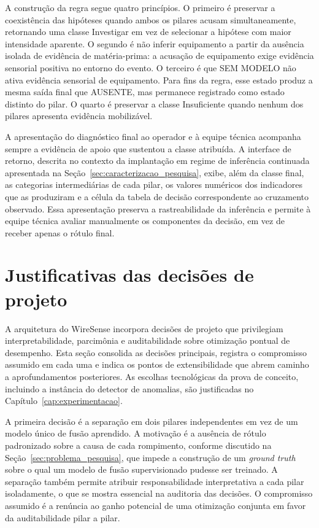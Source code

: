 A construção da regra segue quatro princípios. O primeiro é preservar a coexistência das hipóteses quando ambos os pilares acusam simultaneamente, retornando uma classe Investigar em vez de selecionar a hipótese com maior intensidade aparente. O segundo é não inferir equipamento a partir da ausência isolada de evidência de matéria-prima: a acusação de equipamento exige evidência sensorial positiva no entorno do evento. O terceiro é que SEM MODELO não ativa evidência sensorial de equipamento. Para fins da regra, esse estado produz a mesma saída final que AUSENTE, mas permanece registrado como estado distinto do pilar. O quarto é preservar a classe Insuficiente quando nenhum dos pilares apresenta evidência mobilizável.

A apresentação do diagnóstico final ao operador e à equipe técnica acompanha sempre a evidência de apoio que sustentou a classe atribuída. A interface de retorno, descrita no contexto da implantação em regime de inferência continuada apresentada na Seção~\ref{sec:caracterizacao_pesquisa}, exibe, além da classe final, as categorias intermediárias de cada pilar, os valores numéricos dos indicadores que as produziram e a célula da tabela de decisão correspondente ao cruzamento observado. Essa apresentação preserva a rastreabilidade da inferência e permite à equipe técnica avaliar manualmente os componentes da decisão, em vez de receber apenas o rótulo final.


\section{Justificativas das decisões de projeto}
\label{sec:decisoes_engenharia}

A arquitetura do WireSense incorpora decisões de projeto que privilegiam interpretabilidade, parcimônia e auditabilidade sobre otimização pontual de desempenho. Esta seção consolida as decisões principais, registra o compromisso assumido em cada uma e indica os pontos de extensibilidade que abrem caminho a aprofundamentos posteriores. As escolhas tecnológicas da prova de conceito, incluindo a instância do detector de anomalias, são justificadas no Capítulo~\ref{cap:experimentacao}.

A primeira decisão é a separação em dois pilares independentes em vez de um modelo único de fusão aprendido. A motivação é a ausência de rótulo padronizado sobre a causa de cada rompimento, conforme discutido na Seção~\ref{sec:problema_pesquisa}, que impede a construção de um \emph{ground truth} sobre o qual um modelo de fusão supervisionado pudesse ser treinado. A separação também permite atribuir responsabilidade interpretativa a cada pilar isoladamente, o que se mostra essencial na auditoria das decisões. O compromisso assumido é a renúncia ao ganho potencial de uma otimização conjunta em favor da auditabilidade pilar a pilar.

